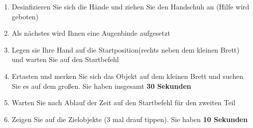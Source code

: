 \documentclass[paper=a4, fontsize=11pt]{scrartcl} %
\numberwithin{equation}{section} %
\numberwithin{figure}{section} %
\numberwithin{table}{section} %
\begin{document}
\begin{enumerate}
\item Desinfizieren Sie sich die Hände und ziehen Sie den Handschuh an (Hilfe wird geboten)
\item Als nächstes wird Ihnen eine Augenbinde aufgesetzt
\item Legen sie Ihre Hand auf die Startposition(rechts neben dem kleinen Brett) und warten Sie auf den Startbefehl
\item Ertasten und merken Sie sich das Objekt auf dem kleinen Brett und suchen Sie es auf dem großen. Sie haben insgesamt \textbf{30 Sekunden}
\item Warten Sie nach Ablauf der Zeit auf den Startbefehl für den zweiten Teil
\item Zeigen Sie auf die Zielobjekte (3 mal drauf tippen). Sie haben \textbf{10 Sekunden}
\end{enumerate}



\end{document}
